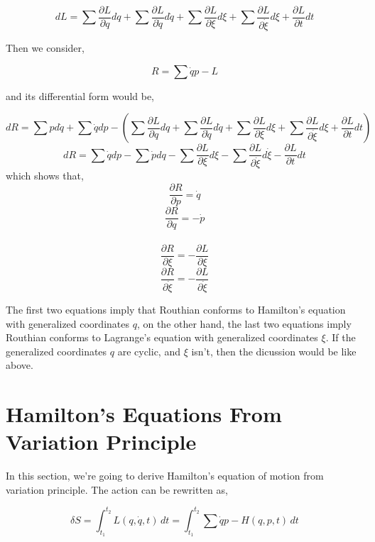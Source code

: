 \documentclass[12pt]{article}
\begin{document}
\begin{center}
    \[ dL = \sum{\frac{\partial L}{\partial q} dq} + \sum{\frac{\partial L}{\partial \dot{q}} d\dot{q}} + \sum{\frac{\partial L}{\partial \xi} d\xi} + \sum{\frac{\partial L}{\partial \dot{\xi}} d\xi} + \frac{\partial L}{\partial t}dt \]
\end{center}

Then we consider,

\begin{center}
    \[ R = \sum{\dot{q}p} - L \]
\end{center}

and its differential form would be,

\begin{center}
    \[ dR = \sum{pd\dot{q}} + \sum{\dot{q}dp} - \left(\sum{\frac{\partial L}{\partial q} dq} + \sum{\frac{\partial L}{\partial \dot{q}} d\dot{q}} + \sum{\frac{\partial L}{\partial \xi} d\xi} + \sum{\frac{\partial L}{\partial \dot{\xi}} d\xi} + \frac{\partial L}{\partial t}dt \right) \]
    \[ dR = \sum{\dot{q}dp} - \sum{\dot{p}dq} - \sum{\frac{\partial L}{\partial \xi}d\xi} - \sum{\frac{\partial L}{\partial \dot{\xi}}d\dot{\xi}} - \frac{\partial L}{\partial t}dt \]
    which shows that,
    \[ \frac{\partial R}{\partial p} = \dot{q} \]
    \[ \frac{\partial R}{\partial q} = - \dot{p} \]\\
    \[ \frac{\partial R}{\partial \xi} = -\frac{\partial L}{\partial \xi} \]
    \[ \frac{\partial R}{\partial \dot{\xi}} = - \frac{\partial L}{\partial \dot{\xi}} \]
\end{center}

The first two equations imply that Routhian conforms to Hamilton's equation with generalized coordinates $q$, on the other hand, the last two equations imply Routhian conforms to Lagrange's equation with generalized coordinates $\xi$. If the generalized coordinates $q$ are cyclic, and $\xi$ isn't, then the dicussion would be like above.

\section{Hamilton's Equations From Variation Principle}

In this section, we're going to derive Hamilton's equation of motion from variation principle. The action can be rewritten as,

\begin{center}
    \[ \delta S = \int_{t_1}^{t_2}  L(q, \dot{q}, t) \,dt = \int_{t_1}^{t_2} \sum{\dot{q}p} - H(q, p, t) \,dt \]
\end{center}
\end{document}
